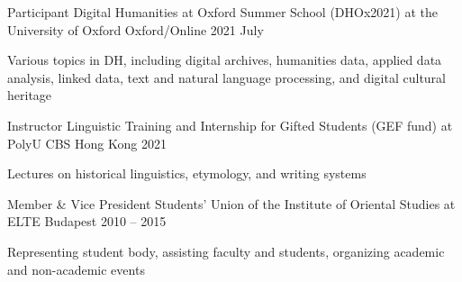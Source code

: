 
\begin{cventries}

  \cventry
    {Participant} %
    {Digital Humanities at Oxford Summer School (DHOx2021) at the University of Oxford} %
    {Oxford/Online} %
    {2021 July} %
    {
      \begin{cvitems} %
        \item {Various topics in DH, including digital archives, humanities data, applied data analysis, linked data, text and natural language processing, and digital cultural heritage}
      \end{cvitems}
    }


  \cventry
    {Instructor} %
    {Linguistic Training and Internship for Gifted Students (GEF fund) at PolyU CBS} %
    {Hong Kong} %
    {2021} %
    {
      \begin{cvitems} %
        \item {Lectures on historical linguistics, etymology, and writing systems}
      \end{cvitems}
    }

  \cventry
    {Member \& Vice President} %
    {Students’ Union of the Institute of Oriental Studies at ELTE} %
    {Budapest} %
    {2010 -- 2015} %
    {
      \begin{cvitems} %
        \item {Representing student body, assisting faculty and students, organizing academic and non-academic events}
      \end{cvitems}
    }
  

\end{cventries}
